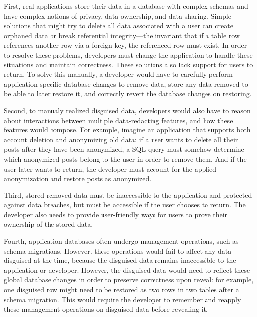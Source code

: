 %
First, real applications store their data in a database with complex schemas and have
complex notions of privacy, data ownership, and data sharing.
%
Simple solutions that might try to delete all data associated with a user can
create orphaned data or break referential integrity---the invariant that if a
table row references another row via a foreign key, the referenced row must
exist. 
%
In order to resolve these problems, developers must change the application to
handle these situations and maintain correctness. These solutions also lack
support for users to return.
%
To solve this manually, a developer would have to carefully perform
application-specific database changes to remove data, store any data removed to
be able to later restore it, and correctly revert the database changes on
restoring.
%

%
Second, to manualy realized disguised data, developers would also have to reason about interactions between multiple
data-redacting features, and how these features would compose.
%
For example, imagine an application that supports both account deletion and
anonymizing old data: if a user wants to delete all their posts after they have
been anonymized, a SQL query must somehow determine which anonymized posts
belong to the user in order to remove them.
%
And if the user later wants to return, the developer must account for the
applied anonymization and restore posts as anonymized.
%

%
Third, stored removed data must be inaccessible to the application and
protected against data breaches, but must be accessible if the user chooses to
return. The developer also needs to provide user-friendly ways for users to
prove their ownership of the stored data.
%

%
Fourth, application databases often undergo management operations, such
as schema migrations. However, these operations would fail to affect any data
disguised at the time, because the disguised data remains inaccessible to the
application or developer. However, the disguised data would need to reflect
these global database changes in order to preserve correctness upon reveal: for
example, one disguised row might need to be restored as two rows in two tables
after a schema migration. This would require the developer to remember and
reapply these management operations on disguised data before revealing it.
%


